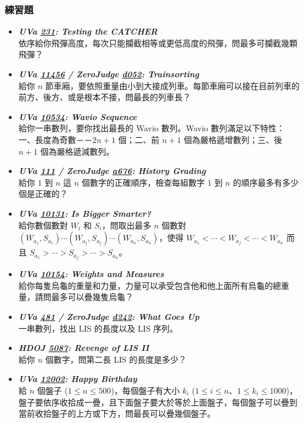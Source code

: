 \subsubsection*{練習題}
\begin{itemize}[label={\Checkmark}]
\item \textbf{\textit{UVa \href{http://uva.onlinejudge.org/external/2/231.html}{231}: Testing the CATCHER}}\\
依序給你飛彈高度，每次只能攔截相等或更低高度的飛彈，問最多可攔截幾顆飛彈？
\item \textbf{\textit{UVa \href{http://uva.onlinejudge.org/external/114/11456.html}{11456} / ZeroJudge \href{http://zerojudge.tw/ShowProblem?problemid=d052}{d052}: Trainsorting}}\\
給你 $n$ 節車廂，要依照重量由小到大接成列車。每節車廂可以接在目前列車的前方、後方、或是根本不接，問最長的列車長？
\item \textbf{\textit{UVa \href{http://uva.onlinejudge.org/external/105/10534.html}{10534}: Wavio Sequence}}\\
給你一串數列，要你找出最長的 Wavio 數列。Wavio 數列滿足以下特性：一、長度為奇數－－$2n+1$ 個；二、前 $n+1$ 個為嚴格遞增數列；三、後 $n+1$ 個為嚴格遞減數列。
\item \textbf{\textit{UVa \href{http://uva.onlinejudge.org/external/1/111.html}{111} / ZeroJudge \href{http://zerojudge.tw/ShowProblem?problemid=a676}{a676}: History Grading}}\\
給你 $1$ 到 $n$ 這 $n$ 個數字的正確順序，檢查每組數字 $1$ 到 $n$ 的順序最多有多少個是正確的？
\item \textbf{\textit{UVa \href{http://uva.onlinejudge.org/external/101/10131.html}{10131}: Is Bigger Smarter?}}\\
給你數個數對 $W_i$ 和 $S_i$，問取出最多 $n$ 個數對 $(W_{a_1}, S_{a_1})\cdots{(W_{a_j}, S_{a_j})}\cdots{(W_{a_n}, S_{a_n})}$，使得 $W_{a_1}<\cdots{}<W_{a_j}<\cdots{}<W_{a_n}$ 而且 $S_{a_1}>\cdots{}>S_{a_j}>\cdots{}>S_{a_n}$。
\item \textbf{\textit{UVa \href{http://uva.onlinejudge.org/external/101/10154.html}{10154}: Weights and Measures}}\\
給你每隻烏龜的重量和力量，力量可以承受包含他和他上面所有烏龜的總重量，請問最多可以疊幾隻烏龜？
\item \textbf{\textit{UVa \href{http://uva.onlinejudge.org/external/4/481.html}{481} / ZeroJudge \href{http://zerojudge.tw/ShowProblem?problemid=d242}{d242}: What Goes Up}}\\
一串數列，找出 LIS 的長度以及 LIS 序列。
\item \textbf{\textit{HDOJ \href{http://acm.hdu.edu.cn/showproblem.php?pid=5087}{5087}: Revenge of LIS II}}\\
給你 $n$ 個數字，問第二長 LIS 的長度是多少？
\item \textbf{\textit{UVa \href{http://uva.onlinejudge.org/external/120/12002.html}{12002}: Happy Birthday}}\\
給 $n$ 個盤子 ($1\leq{n}\leq{500}$)，每個盤子有大小 $k_i$ ($1\leq{i}\leq{n}$、$1\leq{k_i}\leq{1000}$)，盤子要依序收拾成一疊，且下面盤子要大於等於上面盤子，每個盤子可以疊到當前收拾盤子的上方或下方，問最長可以疊幾個盤子。
\end{itemize}
